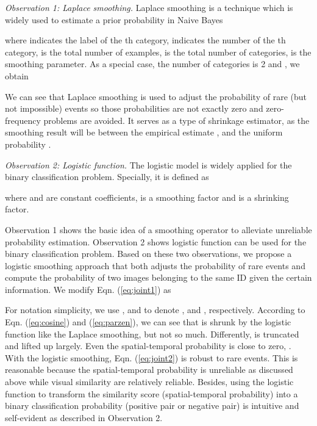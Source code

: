 \documentclass[letterpaper]{article} \usepackage{aaai19}  \usepackage{times}  \usepackage{helvet}  \usepackage{courier}  \usepackage{url}  \usepackage{graphicx}  \usepackage{subfig}
\begin{document}
\emph{Observation 1: Laplace smoothing.} Laplace smoothing is a technique which is widely used to estimate a prior probability in Naive Bayes

where  indicates the label of the th category,  indicates the number of the th category,  is the total number of examples,  is the total number of categories,  is the smoothing parameter. As a special case, the number of categories  is 2 and , we obtain

We can see that Laplace smoothing is used to adjust the probability of rare (but not impossible) events so those probabilities are not exactly zero and zero-frequency problems are avoided. It serves as a type of shrinkage estimator, as the smoothing result will be between the empirical estimate , and the uniform probability .

\emph{Observation 2: Logistic function.} The logistic model is widely applied for the binary classification problem. Specially, it is defined as

where  and  are constant coefficients,  is a smoothing factor and  is a shrinking factor.


Observation 1 shows the basic idea of a smoothing operator to alleviate unreliable probability estimation. Observation 2 shows logistic function can be used for the binary classification problem. Based on these two observations, we propose a logistic smoothing approach that both adjusts the probability of rare events and compute the probability of two images belonging to the same ID given the certain information. We modify Eqn. (\ref{eq:joint1}) as

For notation simplicity, we use ,  and  to denote ,  and , respectively. According to Eqn. (\ref{eq:cosine}) and (\ref{eq:parzen}), we can see that  is shrunk by the logistic function like the Laplace smoothing, but not so much. Differently,  is truncated and lifted up largely. Even the spatial-temporal probability  is close to zero, . With the logistic smoothing, Eqn. (\ref{eq:joint2}) is robust to rare events. This is reasonable because the spatial-temporal probability is unreliable as discussed above while visual similarity are relatively reliable. Besides, using the logistic function to transform the similarity score (spatial-temporal probability) into a binary classification probability (positive pair or negative pair) is intuitive and self-evident as described in Observation 2.
\end{document}

